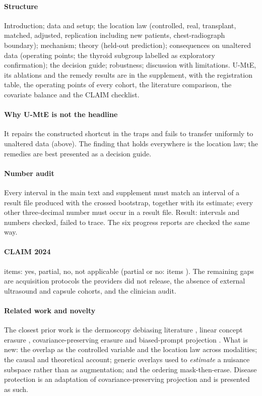 \paragraph{Structure} Introduction; data and setup; the location law (controlled, real, transplant, matched, adjusted,
replication including new patients, chest-radiograph boundary); mechanism; theory (held-out prediction); consequences on
unaltered data (operating points; the thyroid subgroup labelled as exploratory confirmation); the decision guide;
robustness; discussion with limitations. U-MtE, its ablations and the remedy results are in the supplement, with the
registration table, the operating points of every cohort, the literature comparison, the covariate balance and the CLAIM
checklist.
\paragraph{Why U-MtE is not the headline} It repairs the constructed shortcut in the traps and fails to transfer uniformly
to unaltered data (above). The finding that holds everywhere is the location law; the remedies are best presented as a
decision guide.
\paragraph{Number audit} Every interval in the main text and supplement must match an interval of a result file produced
with the crossed bootstrap, together with its estimate; every other three-decimal number must occur in a result file.
Result: \sSixAuditIntervals{} intervals and \sSixAuditNumbers{} numbers checked, \sSixAuditFailed{} failed to trace. The six
progress reports are checked the same way.
\paragraph{CLAIM 2024} \citep{tejani2024claim} \sSixClaimN{} items: \sSixClaimYes{} yes, \sSixClaimPartial{} partial,
\sSixClaimNo{} no, \sSixClaimNA{} not applicable (partial or no: items \sSixClaimPartialItems). The remaining gaps are
acquisition protocols the providers did not release, the absence of external ultrasound and capsule cohorts, and the
clinician audit.
\paragraph{Related work and novelty} The closest prior work is the dermoscopy debiasing literature
\citep{bissoto2020debiasing,bissoto2023tts,nauta2022uncovering}, linear concept erasure \citep{belrose2023leace,ravfogel2020inlp},
covariance-preserving erasure \citep{splice2025} and biased-prompt projection \citep{chuang2023debiasing}. What is new: the
overlap as the controlled variable and the location law across modalities; the causal and theoretical account; generic
overlays used to \emph{estimate} a nuisance subspace rather than as augmentation; and the ordering mask-then-erase. Disease
protection is an adaptation of covariance-preserving projection and is presented as such.

